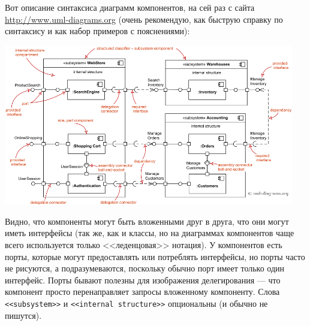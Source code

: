 \documentclass{../text-style}
\begin{document}
Вот описание синтаксиса диаграмм компонентов, на сей раз с сайта \url{http://www.uml-diagrams.org} (очень рекомендую, как быструю справку по синтаксису и как набор примеров с пояснениями):

\begin{center}
    \includegraphics[width=0.95\textwidth]{componentDiagramsOverview.png}
\end{center}

Видно, что компоненты могут быть вложенными друг в друга, что они могут иметь интерфейсы (так же, как и классы, но на диаграммах компонентов чаще всего используется только <<леденцовая>> нотация). У компонентов есть порты, которые могут предоставлять или потреблять интерфейсы, но порты часто не рисуются, а подразумеваются, поскольку обычно порт имеет только один интерфейс. Порты бывают полезны для изображения делегирования --- что компонент просто перенаправляет запросы вложенному компоненту. Слова \verb|<<subsystem>>| и \verb|<<internal structure>>| опциональны (и обычно не пишутся).
\end{document}
